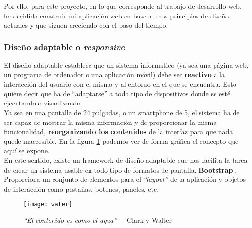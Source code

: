 Por ello, para este proyecto, en lo que corresponde al trabajo de desarrollo web, he decidido construir mi aplicación web en base a unos principios de diseño actuales y que siguen creciendo con el paso del tiempo.

\subsubsection{Diseño adaptable o \textit{responsive}}
El diseño adaptable establece que un sistema informático (ya sea una página web, un programa de ordenador o una aplicación móvil) debe ser \textbf{reactivo} a la interacción del usuario con el mismo y al entorno en el que se encuentra. Esto quiere decir que ha de ``adaptarse'' a todo tipo de dispositivos donde se esté ejecutando o visualizando. \cite{responsivelink}\\

Ya sea en una pantalla de 24 pulgadas, o un smartphone de 5, el sistema ha de ser capaz de mostrar la misma información y de proporcionar la misma funcionalidad, \textbf{reorganizando los contenidos} de la interfaz para que nada quede inaccesible. En la figura \ref{water} podemos ver de forma gráfica el concepto que aquí se expone.\\

En este sentido, existe un framework de diseño adaptable que nos facilita la tarea de crear un sistema usable en todo tipo de formatos de pantalla, \textbf{Bootstrap} \cite{bootstrap}. Proporciona un conjunto de elementos para el \textit{``layout''} de la aplicación y objetos de interacción como pestañas, botones, paneles, etc.

\begin{figure}
    \centering
    \texttt{[image: water]}
    \caption{\textit{``El contenido es como el agua''} - \textcopyright\ Clark y Walter \cite{contentwater}}
    \label{water}
\end{figure}
